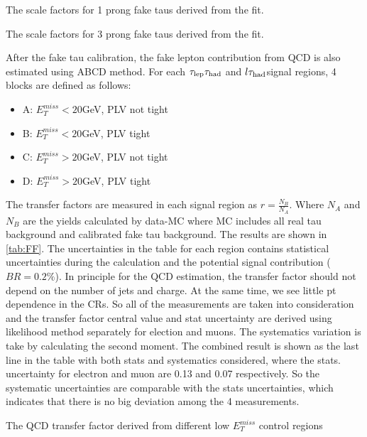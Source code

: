 \begin{table}
\caption{The scale factors for 1 prong fake taus derived from the fit.}

\end{table}
\begin{table}
\caption{The scale factors for 3 prong fake taus derived from the fit.}

\end{table}






After the fake tau calibration, the fake lepton contribution from QCD is also estimated using ABCD method. For each $\tau_\text{lep}{}\tau_\text{had}$ and $l\tau_\text{had}$signal regions, 4 blocks are defined as follows:

\begin{itemize}
	\item A: $E_T^{miss}<20$GeV, PLV not tight
	\item B: $E_T^{miss}<20$GeV, PLV tight
	\item C: $E_T^{miss}>20$GeV, PLV not tight
	\item D: $E_T^{miss}>20$GeV, PLV tight
\end{itemize}
The transfer factors are measured in each signal region as $r=\frac{N_B}{N_A}$. Where $N_A$ and $N_B$ are the yields calculated by data-MC where MC includes all real tau background and calibrated fake tau background. The results are shown in \ref{tab:FF}. The uncertainties in the table for each region contains statistical uncertainties during the calculation and the potential signal contribution ($BR=0.2\%$). In principle for the QCD estimation, the transfer factor should not depend on the number of jets and charge. At the same time, we see little pt dependence in the CRs. So all of the measurements are taken into consideration and the transfer factor central value and stat uncertainty are derived using likelihood method separately for election and muons. The systematics variation is take by calculating the second moment. The combined result is shown as the last line in the table with both stats and systematics considered, where the stats. uncertainty for electron and muon are 0.13 and 0.07 respectively. So the systematic uncertainties are comparable with the stats uncertainties, which indicates that there is no big deviation among the 4 measurements.

\begin{table}
\caption{The QCD transfer factor derived from different low $E_T^{miss}$ control regions}
\label{tab:FF}

\end{table}

